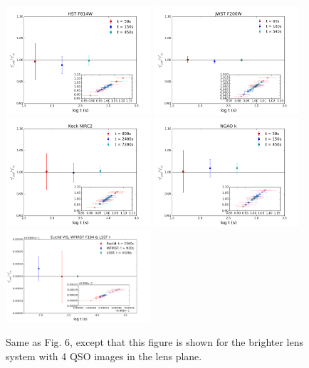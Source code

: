 \documentclass[a4paper,11pt]{article}
\begin{document}


\begin{figure}
\begin{center}
\includegraphics[width=0.48\textwidth]{gamma_0330_anti_4QSOimages_HST.png}
\includegraphics[width=0.48\textwidth]{gamma_0330_anti_4QSOimages_JWST.png} \\
\includegraphics[width=0.48\textwidth]{gamma_0330_anti_4QSOimages_Keck.png}
\includegraphics[width=0.48\textwidth]{gamma_0330_anti_4QSOimages_NGAO.png} \\
\includegraphics[width=0.48\textwidth]{gamma_0330_anti_4QSOimages_EWL.png}
\end{center}
\caption{Same as Fig. 6, except that this figure is shown for the brighter lens system with 4 QSO images in the lens plane.}
\label{fig:gamma_brighter_4QSOimages}
\end{figure}
\end{document}
